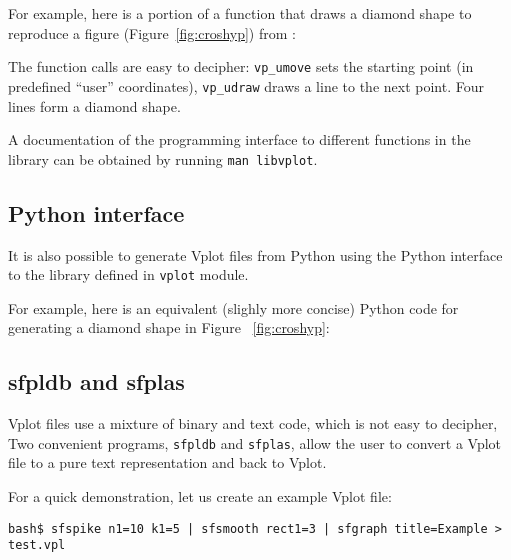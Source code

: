 For example, here is a portion of a function that draws a diamond
shape to reproduce a figure (Figure~\ref{fig:croshyp}) from \cite[]{bei}:

\lstset{language=c,numbers=left,numberstyle=\tiny,showstringspaces=false}


The function calls are easy to decipher: \texttt{vp\_umove} sets the
starting point (in predefined ``user'' coordinates),
\texttt{vp\_udraw} draws a line to the next point. Four lines form a
diamond shape.


A documentation of the programming interface to different functions in
the library can be obtained by running \texttt{man libvplot}.

\subsection{Python interface}

It is also possible to generate Vplot files from Python using the
Python interface to the library defined in \texttt{vplot} module.

For example, here is an equivalent (slighly more concise) Python code
for generating a diamond shape in Figure ~\ref{fig:croshyp}:

\lstset{language=python,numbers=left,numberstyle=\tiny,showstringspaces=false}


\subsection{sfpldb and sfplas}

Vplot files use a mixture of binary and text code, which is not easy
to decipher, Two convenient programs, \texttt{sfpldb} and
\texttt{sfplas}, allow the user to convert a Vplot file to a pure text representation and back to Vplot.

For a quick demonstration, let us create an example Vplot file:
\begin{verbatim}
bash$ sfspike n1=10 k1=5 | sfsmooth rect1=3 | sfgraph title=Example > test.vpl
\end{verbatim}

